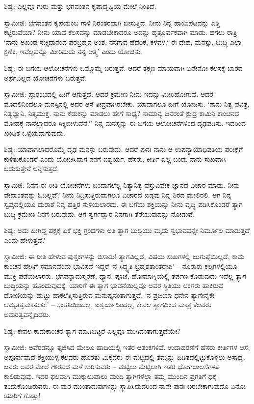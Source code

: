 ಶಿಷ್ಯ: ಎಲ್ಲವೂ ಗುರು ಮತ್ತು ಭಗವಂತನ ಕೃಪಾದೃಷ್ಟಿಯ ಮೇಲೆ ನಿಂತಿದೆ.

ಸ್ವಾಮೀಜಿ: ಭಗವಂತನ ಕೃಪೆಯೆಂಬ ಗಾಳಿ ನಿರಂತರವಾಗಿ ಬೀಸುತ್ತಿದೆ. ನೀನು ನಿನ್ನ ಹಾಯಿಪಟವನ್ನು ಎತ್ತಿ ಕಟ್ಟಿರುವೆಯಾ? ನೀನು ಯಾವ ಕೆಲಸವನ್ನು ಮಾಡಬೇಕಾದರೂ ಅದನ್ನು ಹೃತ್ಪೂರ್ವಕವಾಗಿ ಮಾಡು. ಹಗಲು ರಾತ್ರಿ ‘ನಾನು ಅಖಂಡ ಸಚ್ಚಿದಾನಂದ ಪರಬ್ರಹ್ಮನ ಅಂಶ; ನನಗಾವ ಹೆದರಿಕೆ, ಕಳವಳ? ಈ ದೇಹ, ಮನಸ್ಸು, ಬುದ್ಧಿ ಎಲ್ಲಾ ಕ್ಷಣಿಕ, ಇವೆಲ್ಲವನ್ನೂ ಮೀರಿದುದು ನನ್ನ ಆತ್ಮ’ ಎಂದು ಯೋಚಿಸು.

ಶಿಷ್ಯ: ಈ ಬಗೆಯ ಆಲೋಚನೆಗಳು ಒಮ್ಮೊಮ್ಮೆ ಬರುತ್ತವೆ. ಆದರೆ ತಕ್ಷಣ ಮಾಯವಾಗಿ ಏನೇನೋ ಕೆಲಸಕ್ಕೆ ಬಾರದ ಅರ್ಥವಿಲ್ಲದ ಯೋಚನೆಗಳು ಬರುತ್ತವೆ.

ಸ್ವಾಮೀಜಿ: ಪ್ರಾರಂಭದಲ್ಲಿ ಹೀಗೆ ಆಗುತ್ತದೆ. ಆದರೆ ಕ್ರಮೇಣ ನೀನು ಇದನ್ನು ಮೀರಿಹೋಗುವೆ. ಆದರೆ ಮೊದಲಿನಿಂದಲೂ ಮನಸ್ಸಿನಲ್ಲಿ ಅದರ ಆಸೆ ತೀವ್ರವಾಗಿರಬೇಕು. ಯಾವಾಗಲೂ ಹೀಗೆ ಯೋಚಿಸು: ‘ನಾನು ನಿತ್ಯ ಪವಿತ್ರ, ನಿತ್ಯಜ್ಞಾನಿ, ನಿತ್ಯಮುಕ್ತ. ನಾನು ಕೆಡುಕನ್ನು ಮಾಡಲು ಹೇಗೆ ಸಾಧ್ಯ? ಸಾಮಾನ್ಯ ಜನರಂತೆ ಕ್ಷುದ್ರ ಕಾಮಿನಿ ಕಾಂಚನದ ಮೋಹಕ್ಕೆ ನಾನೆಲ್ಲಾದರೂ ಸಿಕ್ಕಿಬೀಳುವೆನೆ?’ ನಿನ್ನ ಮನಸ್ಸನ್ನು ಈ ಬಗೆಯ ಆಲೋಚನೆಗಳಿಂದ ದೃಢಪಡಿಸು. ಇದರಿಂದ ಖಂಡಿತ ಒಳ್ಳೆಯದಾಗುವುದು.

ಶಿಷ್ಯ: ಯಾವಾಗಲಾದರೊಮ್ಮೆ ದೃಢ ಮನಸ್ಸು ಬರುವುದು. ಆದರೆ ಪುನಃ ನಾನು ಆ ಉಪನ್ಯಾಯಾಧಿಪತಿಯ ಪರೀಕ್ಷೆಗೆ ಕುಳಿತುಕೊಂಡರೆ ಎಂದು ಯೋಚಿಸಿದಾಗ ನನಗೆ ಐಶ್ವರ್ಯ, ಹೆಸರು, ಕೀರ್ತಿ ಎಲ್ಲ ಬಂದು ನಾನು ಸುಖವಾಗಿ ಬದುಕುತ್ತೇನೆ ಅನ್ನಿಸುತ್ತದೆ.

ಸ್ವಾಮಿಜಿ: ನಿನಗೆ ಈ ರೀತಿ ಯೋಚನೆಗಳು ಬಂದಾಗಲೆಲ್ಲ ನಿತ್ಯಾನಿತ್ಯ ವಸ್ತುವಿವೇಕ ಜ್ಞಾನದ ವಿಚಾರ ಮಾಡು. ನೀನು ವೇದಾಂತವನ್ನು ಓದಿಲ್ಲವೆ? ನೀನು ನಿದ್ರಿಸುತ್ತಿರುವಾಗಲೂ ವಿಚಾರದ ಖಡ್ಗವು ನಿನ್ನ ಶಿರದ ಮೇಲಿರಲಿ. ಆಗ ನಿನ್ನ ಸ್ವಪ್ನದಲ್ಲಿಯೂ ದುರಾಶೆ ನಿನ್ನ ಹತ್ತಿರ ಸುಳಿಯಲಾರದು. ಈ ಬಗೆಯ ಶಕ್ತಿಯನ್ನು ನೀನು ವೃದ್ಧಿ ಪಡಿಸಿಕೊಂಡರೆ ತ್ಯಾಗ ಬುದ್ಧಿ ಕ್ರಮೇಣ ನಿನಗೆ ಬರುವುದು. ಆಗ ಸ್ವರ್ಗದ್ವಾರ ನಿನಗಾಗಿ ತೆರೆಯುವುದನ್ನು ನೋಡುವೆ.

ಶಿಷ್ಯ: ಅದು ಹೀಗಿದ್ದ ಪಕ್ಷಕ್ಕೆ ಏಕೆ ಭಕ್ತಿ ಗ್ರಂಥಗಳು ಅತಿ ತ್ಯಾಗ ಬುದ್ಧಿಯು ಮೃದು ಸ್ವಭಾವವನ್ನೇ ನಿರ್ಮೂಲ ಮಾಡುತ್ತದೆ ಎಂದು ಹೇಳುತ್ತವೆ?

ಸ್ವಾಮೀಜಿ: ಈ ರೀತಿ ಹೇಳುವ ಪುಸ್ತಕಗಳನ್ನು ಬಿಸಾಡು! ತ್ಯಾಗವಿಲ್ಲದೆ, ವಿಷಯ ಸುಖಗಳಲ್ಲಿ ಜುಗುಪ್ಸೆಯಿಲ್ಲದೆ, ಕಾಮ ಕಾಂಚನ ಹೇಸಿಗೆ ಸಮಾನವೆಂದು ಭಾವಿಸದೆ ಇದ್ದರೆ ‘ನ ಸಿದ್ಧ್ಯತಿ ಬ್ರಹ್ಮಶತಾಂತರೇಪಿ’ – ನೂರಾರು ಕಲ್ಪಗಳಲ್ಲಿಯೂ ಮುಕ್ತಿ ಪಡೆಯಲಾರರು. ಭಗವನ್ನಾಮಸ್ಮರಣೆ, ಧ್ಯಾನ, ಪೂಜೆ, ಹೋಮಾಗ್ನಿಯಲ್ಲಿ ತರ್ಪಣ ಕೊಡುವುದು ಇವೆಲ್ಲ ತ್ಯಾಗ ಬುದ್ಧಿಯನ್ನು ಹೊಂದುವುದಕ್ಕೆ. ಯಾರಿಗೆ ಈ ತ್ಯಾಗ ಭಾವನೆಯಿಲ್ಲವೊ ಅವರ ಸ್ಥಿತಿಯು ಲಂಗರು ಹಾಕಿರುವ ದೋಣಿಯನ್ನು ಹುಟ್ಟು ಹಾಕಲೆತ್ನಿಸುತ್ತಿರುವ ಮನುಷ್ಯನಂತಾಗುತ್ತದೆ. ‘ನ ಪ್ರಜಯಾ ಧನೇನ ತ್ಯಾಗೇನೈಕೇ ಅಮೃತತ್ವಮಾನುಶುಃ’ – ಸಂತತಿಯಿಂದಲ್ಲ, ಐಶ್ವರ್ಯದಿಂದಲ್ಲ, ಕೇವಲ ತ್ಯಾಗದಿಂದ ಮಾತ್ರ ಕೆಲವರು ಅಮರತ್ವವನ್ನೈದಿದರು.

ಶಿಷ್ಯ: ಕೇವಲ ಕಾಮಕಾಂಚನ ತ್ಯಾಗ ಮಾಡಿಬಿಟ್ಟರೆ ಎಲ್ಲವೂ ಮುಗಿದಂತಾಗುತ್ತದೆಯೇ?

ಸ್ವಾಮೀಜಿ: ಅವೆರಡನ್ನೂ ತ್ಯಜಿಸಿದ ಮೇಲೂ ಹಾದಿಯಲ್ಲಿ ಇತರ ಆತಂಕಗಳಿವೆ. ಉದಾಹರಣೆಗೆ ಹೆಸರು ಕೀರ್ತಿಗಳ ಆಸೆ, ಅಪೂರ್ವವಾದ ಶಕ್ತಿಯುಳ್ಳ ಕೆಲವರು ಹೊರತು ಮಿಕ್ಕವರು ಈ ಮಟ್ಟದಲ್ಲಿ ತಮ್ಮನ್ನು ಹಿಡಿತದಲ್ಲಿಟ್ಟುಕೊಳ್ಳಲು ಅಸಾಧ್ಯ. ಜನರು ಅವರ ಮೇಲೆ ಗೌರವದ ಮಳೆ ಸುರಿಸುವರು – ಮಟ್ಟಿಲು ಮೆಟ್ಟಿಲಾಗಿ ಇತರ ಭೋಗಲಾಲಸೆಗಳೂ ಕಾಲಿಡುವುವು. ಇದರ ಫಲವಾಗಿ ಮುಕ್ಕಾಲುಪಾಲು ಮಂದಿ ತ್ಯಾಗಿಗಳೆಲ್ಲಾ ತಮ್ಮ ಮುಂದಿನ ಪ್ರಗತಿಗೆ ಧಕ್ಕೆ ತಂದುಕೊಂಡಿರುವರು. ಈ ಮಠ ಮುಂತಾದುವುಗಳನ್ನು ಸ್ಥಾಪಿಸಿದುದರಿಂದ ನಾನೇ ಪುನಃ ಬರಬೇಕಾಗುವುದೊ ಏನೋ ಯಾರಿಗೆ ಗೊತ್ತು!

